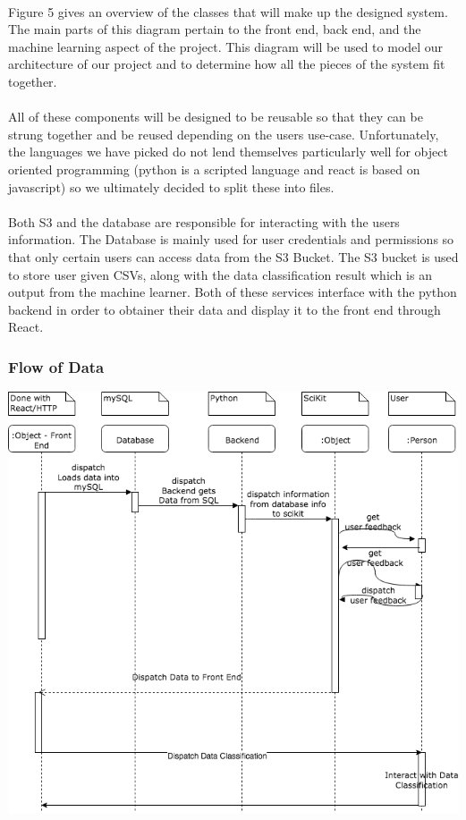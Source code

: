 \documentclass[12pt,oneside,letterpaper]{article}
\begin{document}
\paragraph{}Figure 5 gives an overview of the classes that will make up the designed system. The main parts of this diagram pertain to the front end, back end, and the machine learning aspect of the project. This diagram will be used to model our architecture of our project and to determine how all the pieces of the system fit together. 
 \paragraph{} All of these components will be designed to be reusable so that they can be strung together and be reused depending on the users use-case. Unfortunately, the languages we have picked do not lend themselves particularly well for object oriented programming (python is a scripted language and react is based on javascript) so we ultimately decided to split these into files.
  \paragraph{} Both S3 and the database are responsible for interacting with the users information. The Database is mainly used for user credentials and permissions so that only certain users can access data from the S3 Bucket. The S3 bucket is used to store user given CSVs, along with the data classification result which is an output from the machine learner. Both of these services interface with the python backend in order to obtainer their data and display it to the front end through React.

\subsubsection{Flow of Data}
\includegraphics[scale = 0.52]{YarmSequenceDiagram.png}
\begingroup
{}
\endgroup
\end{document}
